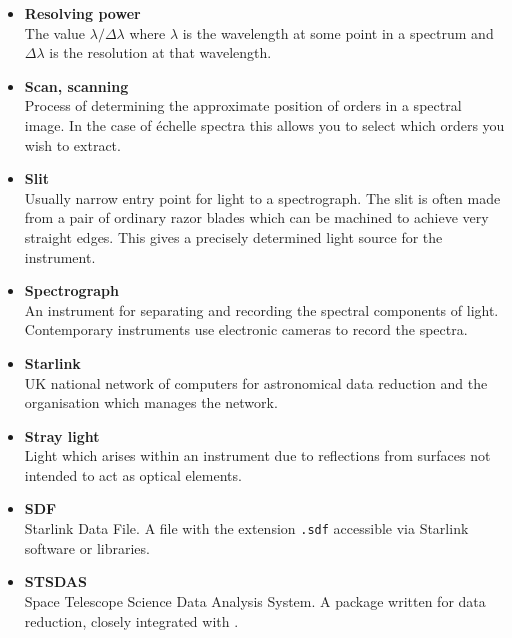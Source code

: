 \begin{itemize}
\item {\bf\label{gl_resolving_power}Resolving power}\\
      The value $\lambda/\Delta\lambda$ where $\lambda$ is the wavelength
      at some point in a spectrum and $\Delta\lambda$ is the resolution
      at that wavelength.

\item {\bf\label{gl_scanning}Scan, scanning}\\
      Process of determining the approximate position of orders in a
      spectral image.  In the case of \'{e}chelle spectra this allows
      you to select which orders you wish to extract.

\item {\bf\label{gl_slit}Slit}\\
      Usually narrow entry point for light to a spectrograph.
      The slit is often made from a pair of ordinary razor blades which can
      be machined to achieve very straight edges.  This gives a precisely
      determined light source for the instrument.

\item {\bf\label{gl_spectrograph}Spectrograph}\\
      An instrument for separating and recording the spectral components of
      light.  Contemporary instruments use electronic cameras to record the
      spectra.

\item {\bf\label{gl_starlink}Starlink}\\
      UK national network of computers for astronomical data reduction
      and the organisation which manages the network.

\item {\bf\label{gl_stray_light}Stray light}\\
      Light which arises within an instrument due to reflections from
      surfaces not intended to act as optical elements.

\item {\bf\label{gl_sdf}SDF}\\
      Starlink Data File.  A file with the extension \verb+.sdf+
      accessible via Starlink software or libraries.

\item {\bf\label{gl_stsdas}STSDAS}\\
      Space Telescope Science Data Analysis System.  A package written
      for  data reduction, closely integrated
      with .


\end{itemize}
